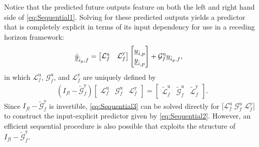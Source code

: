 Notice that the predicted future outputs feature on both the left and right hand side of \eqref{eq:Sequential1}. Solving for these predicted outputs yields a predictor that is completely explicit in terms of its input dependency for use in a receding horizon framework:
\begin{align}\label{eq:Sequential2}
    \underline{\hat{y}}_{\hat{i}_p,f} &=
    \begin{bmatrix}
        \mathcal{L}^\mathrm{u}_f & \mathcal{L}^\mathrm{y}_f 
    \end{bmatrix}    
    \begin{bmatrix}
        \underline{u}_{\hat{i},p}\\
        \underline{y}_{\hat{i},p}
    \end{bmatrix}+
    \mathcal{G}^\mathrm{u}_f
    \underline{u}_{\hat{i}_p,f},
\end{align}
in which $\mathcal{L}^\mathrm{u}_f$, $\mathcal{G}^\mathrm{u}_f$, and $\mathcal{L}^\mathrm{y}_f$ are uniquely defined by
\begin{align}\label{eq:Sequential3}
    \left(I_{fl}-\widetilde{\mathcal{G}}^\mathrm{y}_f\right)
    \begin{bmatrix}
        \mathcal{L}^\mathrm{u}_f & \mathcal{G}^\mathrm{u}_f & \mathcal{L}^\mathrm{y}_f
    \end{bmatrix}=
    \begin{bmatrix}
        \widetilde{\mathcal{L}}^\mathrm{u}_f & \widetilde{\mathcal{G}}^\mathrm{u}_f & \widetilde{\mathcal{L}}^\mathrm{y}_f
    \end{bmatrix}.
\end{align}
Since $I_{fl}-\widetilde{\mathcal{G}}^\mathrm{y}_f$ is invertible, \eqref{eq:Sequential3} can be solved directly for $\big[\mathcal{L}^\mathrm{u}_f \; \mathcal{G}^\mathrm{u}_f \; \mathcal{L}^\mathrm{y}_f\big]$ to construct the input-explicit predictor given by \eqref{eq:Sequential2}. However, an efficient sequential procedure is also possible that exploits the structure of $I_{fl}-\widetilde{\mathcal{G}}^\mathrm{y}_f$.

